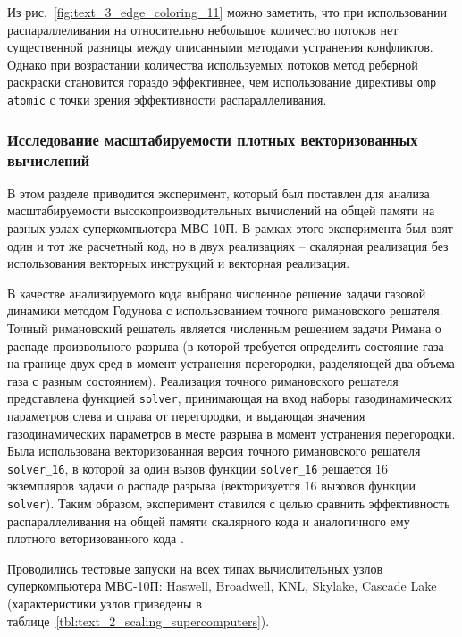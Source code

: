 Из рис.~\ref{fig:text_3_edge_coloring_11} можно заметить, что при использовании распараллеливания на относительно небольшое количество потоков нет существенной разницы между описанными методами устранения конфликтов.
Однако при возрастании количества используемых потоков метод реберной раскраски становится гораздо эффективнее, чем использование директивы \texttt{omp atomic} с точки зрения эффективности распараллеливания.

\subsubsection{Исследование масштабируемости плотных векторизованных вычислений}

В этом разделе приводится эксперимент, который был поставлен для анализа масштабируемости высокопроизводительных вычислений на общей памяти на разных узлах суперкомпьютера МВС-10П.
В рамках этого эксперимента был взят один и тот же расчетный код, но в двух реализациях -- скалярная реализация без использования векторных инструкций и векторная реализация.

В качестве анализируемого кода выбрано численное решение задачи газовой динамики методом Годунова с использованием точного римановского решателя.
Точный римановский решатель является численным решением задачи Римана о распаде произвольного разрыва (в которой требуется определить состояние газа на границе двух сред в момент устранения перегородки, разделяющей два объема газа с разным состоянием).
Реализация точного римановского решателя \cite{riemannvecGithub} представлена функцией \texttt{solver}, принимающая на вход наборы газодинамических параметров слева и справа от перегородки, и выдающая значения газодинамических параметров в месте разрыва в момент устранения перегородки.
Была использована векторизованная версия точного римановского решателя \texttt{solver\_16}, в которой за один вызов функции \texttt{solver\_16} решается 16 экземпляров задачи о распаде разрыва (векторизуется 16 вызовов функции \texttt{solver}).
Таким образом, эксперимент ставился с целью сравнить эффективность распараллеливания на общей памяти скалярного кода и аналогичного ему плотного веторизованного кода \cite{Vorobyov2020ParVec,Vorobyov2020Scaling}.

Проводились тестовые запуски на всех типах вычислительных узлов суперкомпьютера МВС-10П: Haswell, Broadwell, KNL, Skylake, Cascade Lake (характеристики узлов приведены в таблице~\ref{tbl:text_2_scaling_supercomputers}).

